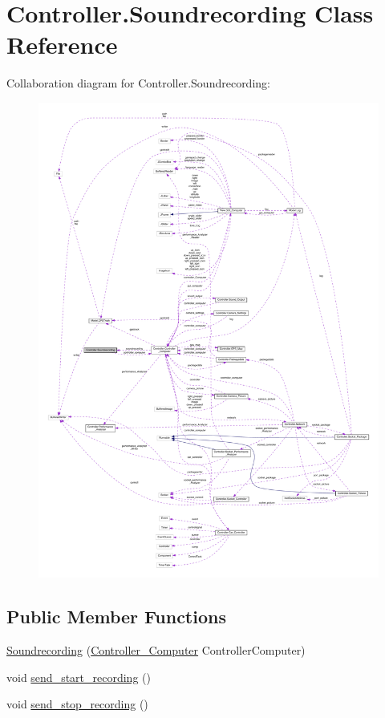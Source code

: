 \hypertarget{class_controller_1_1_soundrecording}{}\section{Controller.\+Soundrecording Class Reference}
\label{class_controller_1_1_soundrecording}


Collaboration diagram for Controller.\+Soundrecording\+:
\nopagebreak
\begin{figure}[H]
\begin{center}
\leavevmode
\includegraphics[width=350pt]{class_controller_1_1_soundrecording__coll__graph}
\end{center}
\end{figure}
\subsection*{Public Member Functions}
\begin{DoxyCompactItemize}
\item 
\hyperlink{class_controller_1_1_soundrecording_a1662fdc0277400c0a1482577d690d53e}{Soundrecording} (\hyperlink{class_controller_1_1_controller___computer}{Controller\+\_\+\+Computer} Controller\+Computer)
\item 
void \hyperlink{class_controller_1_1_soundrecording_aca2b59dbe46c49c3def7ac90bc84d5f8}{send\+\_\+start\+\_\+recording} ()
\item 
void \hyperlink{class_controller_1_1_soundrecording_a9cdfc2b331d3559ea510e1ccf0d36226}{send\+\_\+stop\+\_\+recording} ()
\end{DoxyCompactItemize}


